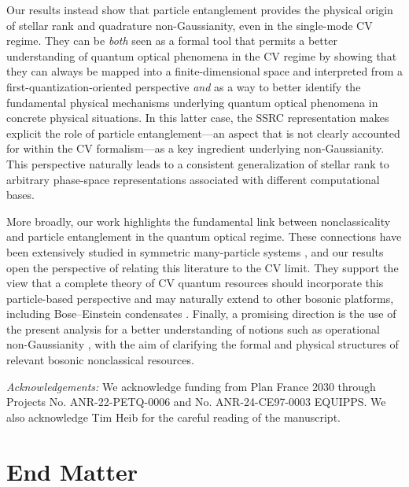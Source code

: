 \documentclass[aps,prl,showpacs,twocolumn]{revtex4-2}
\begin{document}
Our results instead show that particle entanglement provides the physical origin of stellar rank and quadrature non-Gaussianity, even in the single-mode CV regime. They can be {\it both} seen as a formal tool that permits a better understanding of quantum optical phenomena in the CV regime by showing that they can always be mapped into a finite-dimensional space and interpreted from a first-quantization-oriented perspective {\it and} as a way to better identify the fundamental physical mechanisms underlying quantum optical phenomena in concrete physical situations. In this latter case, the SSRC representation makes explicit the role of particle entanglement—an aspect that is not clearly accounted for within the CV formalism—as a key ingredient underlying non-Gaussianity. This perspective naturally leads to a consistent generalization of stellar rank to arbitrary phase-space representations associated with different computational bases.



More broadly, our work highlights the fundamental link between nonclassicality and particle entanglement in the quantum optical regime. These connections have been extensively studied in symmetric many-particle systems \cite{Giraud_2010,PhysRevLett.103.070503,PhysRevLett.106.180502,Albach,PhysRevA.87.012104,Aulbach2010MaxEntSymmetric,PhysRevA.105.022433,PhysRevA.96.032304,Rudzinski2024orthonormalbasesof,PhysRevA.90.050302,10.1088/1361-6633/ae440a,sanchezsoto2026quantumskymajoranastars}, and our results open the perspective of relating this literature to the CV limit. They support the view that a complete theory of CV quantum resources should incorporate this particle-based perspective and may naturally extend to other bosonic platforms, including Bose–Einstein condensates \cite{PhysRevA.85.040306,PhysRevA.88.023609}. Finally, a promising direction is the use of the present analysis for a better understanding of notions such as operational non-Gaussianity \cite{ldbf-vbyp}, with the aim of clarifying the formal and physical structures of relevant bosonic nonclassical resources.




{\it Acknowledgements:} We acknowledge funding from Plan France 2030 through Projects No. ANR-22-PETQ-0006 and No. ANR-24-CE97-0003 EQUIPPS. We also acknowledge Tim Heib for the careful reading of the manuscript.
\clearpage
\section{End Matter}
\end{document}

